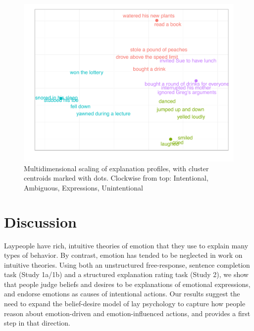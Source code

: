 \documentclass[10pt,letterpaper]{article}
\begin{document}
\begin{figure}[htb!]
\begin{center}\includegraphics[width=1\columnwidth]{images/study2MDS.pdf}\end{center}
\caption{ Multidimensional scaling of explanation profiles, with cluster centroids marked with dots. Clockwise from top: Intentional, Ambiguous, Expressions, Unintentional}
\label{Study2MDSFig}
\end{figure}


\section{Discussion}

Laypeople have rich, intuitive theories of emotion that they use to explain many types of behavior. By contrast, emotion has tended to be neglected in work on intuitive theories. 
Using both an unstructured free-response, sentence completion task (Study 1a/1b) and a structured explanation rating task (Study 2), we show that people 
judge beliefs and desires to be explanations of emotional expressions,
and endorse emotions as causes of intentional actions. 
Our results suggest the need to expand the belief-desire model of lay psychology to %
capture how people reason about emotion-driven and emotion-influenced actions,
and provides a first step in that direction.
\end{document}
